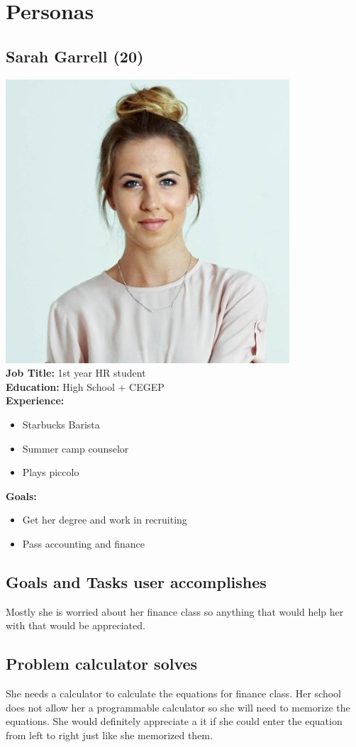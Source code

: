 \documentclass{article}
\begin{document}
\section*{Personas}
\subsection*{Sarah Garrell (20)}
\includegraphics[scale=0.5]{sarah.png}\\
\textbf{Job Title: }1st year HR student\\
\textbf{Education:} High School + CEGEP\\
\textbf{Experience:}
\begin{itemize}
\itemsep0em 
\item Starbucks Barista
\item Summer camp counselor
\item Plays piccolo
\end{itemize}
\textbf{Goals:}
\begin{itemize}
\itemsep0em 
\item Get her degree and work in recruiting
\item Pass accounting and finance
\end{itemize}

\subsection*{Goals and Tasks user accomplishes}
Mostly she is worried about her finance class so anything that would help her with that would be appreciated.
\subsection*{Problem calculator solves}
She needs a calculator to calculate the equations for finance class. Her school does not allow her a programmable calculator so she will need to memorize the equations. She would definitely appreciate a it if she could enter the equation from left to right just like she memorized them.
\pagebreak
\end{document}
